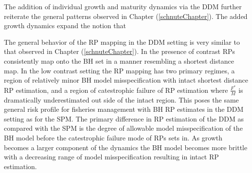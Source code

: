%
The addition of individual growth and maturity dynamics via the DDM further 
reiterate the general patterns observed in Chapter (\ref{schnuteChapter}). The 
added growth dynamics expand the notion that 


%
The general behavior of the RP mapping in the DDM setting is very similar to 
that observed in Chapter (\ref{schnuteChapter}). In the presence of contrast 
RPs consistently map onto the BH set in a manner resembling a shortest distance map.
In the low contrast setting the RP mapping has two primary regimes, a region of relatively 
minor BH model misspecification with intact shortest distance RP estimation, and a region of %
catestrophic failure of RP estimation where $\frac{F^*}{M}$ is dramatically underestimated 
out side of the intact region. This poses the same general risk profile for fisheries 
management with BH RP estimates in the DDM setting as for the SPM. The primary difference 
in RP estimation of the DDM as compared with the SPM is the degree of allowable model 
misspecification of the BH model before the catestrophic failure mode of RPs sets in. 
As growth becomes a larger component of the dynamics the BH model becomes more brittle 
with a decreasing range of model misspecification resulting in intact RP estimation.
 

